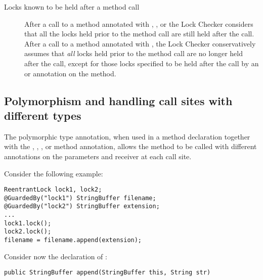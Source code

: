 \begin{description}
\item[Locks known to be held after a method call]
  After a call to a method annotated with ,
  ,  or 
  the Lock Checker considers that all the
  locks held prior to the method call are still held after the call.
  After a call to a method annotated with ,
  the Lock Checker conservatively assumes that \emph{all} locks held
  prior to the method call are no longer held after the call,
  except for those locks specified to be held after the call
  by an  or 
  annotation on the method.

\end{description}


\subsection{Polymorphism and handling call sites with different types\label{lock-checker-polymorphism}}

The polymorphic  type annotation, when used in a method
declaration together with the , ,
, or  method annotation, allows the method
to be called with different  annotations on the parameters
and receiver at each call site.

Consider the following example:

\begin{verbatim}
ReentrantLock lock1, lock2;
@GuardedBy("lock1") StringBuffer filename;
@GuardedBy("lock2") StringBuffer extension;
...
lock1.lock();
lock2.lock();
filename = filename.append(extension);
\end{verbatim}

Consider now the declaration of :

\begin{verbatim}
public StringBuffer append(StringBuffer this, String str)
\end{verbatim}

